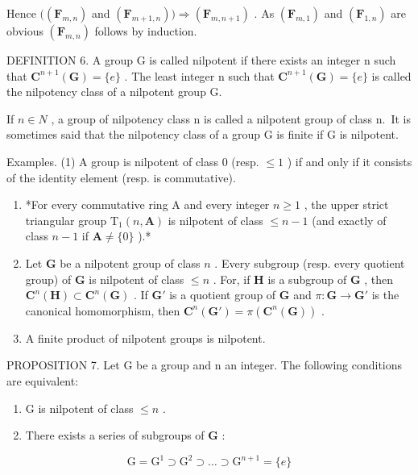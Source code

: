 Hence \(((\mathbf{F}_{m,n})\) and \((\mathbf{F}_{m + 1,n}))\Rightarrow (\mathbf{F}_{m,n + 1})\) . As \((\mathbf{F}_{m,1})\) and \((\mathbf{F}_{1,n})\) are obvious \((\mathbf{F}_{m,n})\) follows by induction.

DEFINITION 6. A group G is called nilpotent if there exists an integer n such that \(\mathbf{C}^{n+1}(\mathbf{G}) = \{e\}\) . The least integer n such that \(\mathbf{C}^{n+1}(\mathbf{G}) = \{e\}\) is called the nilpotency class of a nilpotent group G.

If \(n \in N\) , a group of nilpotency class n is called a nilpotent group of class n.~It is sometimes said that the nilpotency class of a group G is finite if G is nilpotent.

Examples. (1) A group is nilpotent of class 0 (resp. \(\leqslant 1\) ) if and only if it consists of the identity element (resp. is commutative).

\begin{enumerate}
\def\labelenumi{(\arabic{enumi})}
\setcounter{enumi}{1}
\item
  *For every commutative ring A and every integer \(n \geqslant 1\) , the upper strict triangular group \(\mathrm{T}_1(n, \mathbf{A})\) is nilpotent of class \(\leqslant n - 1\) (and exactly of class \(n - 1\) if \(\mathbf{A} \neq \{0\}\) ).*
\item
  Let \(\mathbf{G}\) be a nilpotent group of class \(n\) . Every subgroup (resp. every quotient group) of \(\mathbf{G}\) is nilpotent of class \(\leqslant n\) . For, if \(\mathbf{H}\) is a subgroup of \(\mathbf{G}\) , then \(\mathbf{C}^n (\mathbf{H})\subset \mathbf{C}^n (\mathbf{G})\) . If \(\mathbf{G}'\) is a quotient group of \(\mathbf{G}\) and \(\pi : \mathbf{G}\to \mathbf{G}'\) is the canonical homomorphism, then \(\mathbf{C}^n (\mathbf{G}') = \pi (\mathbf{C}^n (\mathbf{G}))\) .
\item
  A finite product of nilpotent groups is nilpotent.
\end{enumerate}

PROPOSITION 7. Let G be a group and n an integer. The following conditions are equivalent:

\begin{enumerate}
\def\labelenumi{(\alph{enumi})}
\item
  G is nilpotent of class \(\leqslant n\) .
\item
  There exists a series of subgroups of \(\mathbf{G}\) :
\end{enumerate}

\[
\mathrm{G} = \mathrm{G} ^ {1} \supset \mathrm{G} ^ {2} \supset \dots \supset \mathrm{G} ^ {n + 1} = \{e \}
\]

